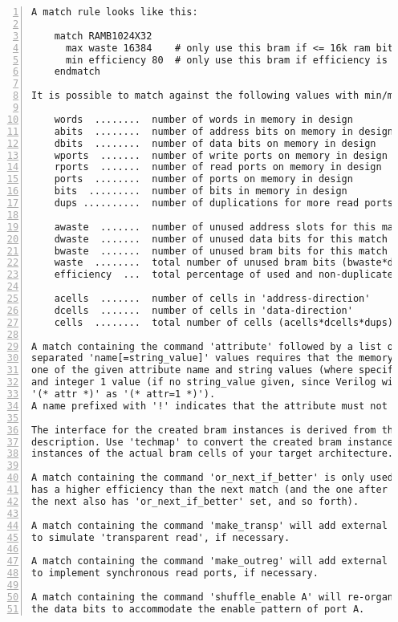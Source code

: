 \begin{lstlisting}[numbers=left,frame=single]
A match rule looks like this:

    match RAMB1024X32
      max waste 16384    # only use this bram if <= 16k ram bits are unused
      min efficiency 80  # only use this bram if efficiency is at least 80%
    endmatch

It is possible to match against the following values with min/max rules:

    words  ........  number of words in memory in design
    abits  ........  number of address bits on memory in design
    dbits  ........  number of data bits on memory in design
    wports  .......  number of write ports on memory in design
    rports  .......  number of read ports on memory in design
    ports  ........  number of ports on memory in design
    bits  .........  number of bits in memory in design
    dups ..........  number of duplications for more read ports

    awaste  .......  number of unused address slots for this match
    dwaste  .......  number of unused data bits for this match
    bwaste  .......  number of unused bram bits for this match
    waste  ........  total number of unused bram bits (bwaste*dups)
    efficiency  ...  total percentage of used and non-duplicated bits

    acells  .......  number of cells in 'address-direction'
    dcells  .......  number of cells in 'data-direction'
    cells  ........  total number of cells (acells*dcells*dups)

A match containing the command 'attribute' followed by a list of space
separated 'name[=string_value]' values requires that the memory contains any
one of the given attribute name and string values (where specified), or name
and integer 1 value (if no string_value given, since Verilog will interpret
'(* attr *)' as '(* attr=1 *)').
A name prefixed with '!' indicates that the attribute must not exist.

The interface for the created bram instances is derived from the bram
description. Use 'techmap' to convert the created bram instances into
instances of the actual bram cells of your target architecture.

A match containing the command 'or_next_if_better' is only used if it
has a higher efficiency than the next match (and the one after that if
the next also has 'or_next_if_better' set, and so forth).

A match containing the command 'make_transp' will add external circuitry
to simulate 'transparent read', if necessary.

A match containing the command 'make_outreg' will add external flip-flops
to implement synchronous read ports, if necessary.

A match containing the command 'shuffle_enable A' will re-organize
the data bits to accommodate the enable pattern of port A.
\end{lstlisting}

